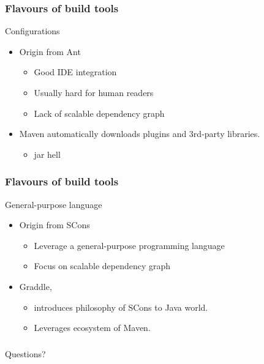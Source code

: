 \documentclass[lualatex]{beamer}
\begin{document}
\begin{frame}
  \frametitle{Flavours of build tools}

  \begin{block}{Configurations}
    \begin{itemize}
    \item Origin from Ant
      \begin{itemize}
      \item Good IDE integration
      \item Usually hard for human readers
      \item Lack of scalable dependency graph
      \end{itemize}
    \item Maven automatically downloads plugins and 3rd-party libraries.
      \begin{itemize}
        \item jar hell
      \end{itemize}
    \end{itemize}
  \end{block}
\end{frame}

\begin{frame}
  \frametitle{Flavours of build tools}

  \begin{block}{General-purpose language}
    \begin{itemize}
    \item Origin from SCons
      \begin{itemize}
      \item Leverage a general-purpose programming language
      \item Focus on scalable dependency graph
      \end{itemize}
    \item Graddle,
      \begin{itemize}
      \item introduces philosophy of SCons to Java world.
      \item Leverages ecosystem of Maven.
      \end{itemize}
    \end{itemize}
  \end{block}
\end{frame}

\begin{frame}
  \frametitle{}
  \begin{center}
    \Huge
    Questions?
  \end{center}
\end{frame}
\end{document}

